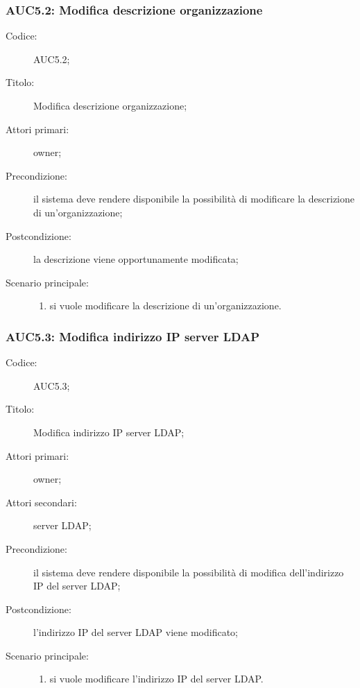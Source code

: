 \documentclass[../../../analisi-dei-requisiti.tex]{subfiles}
\begin{document}
\subsubsection{AUC5.2: Modifica descrizione organizzazione}%
\label{subs:AUC5.2}
\begin{description}
  \item[Codice:] AUC5.2;
  \item[Titolo:] Modifica descrizione organizzazione;
  \item[Attori primari:] owner;
  \item[Precondizione:] il sistema deve rendere disponibile la possibilità di modificare la descrizione di un'organizzazione;
  \item[Postcondizione:] la descrizione viene opportunamente modificata;
  \item[Scenario principale:]
        \begin{enumerate}
          \item si vuole modificare la descrizione di un'organizzazione.
        \end{enumerate}
\end{description}


\subsubsection{AUC5.3: Modifica indirizzo IP server LDAP}%
\label{subs:AUC5.3}
\begin{description}
  \item[Codice:] AUC5.3;
  \item[Titolo:] Modifica indirizzo IP server LDAP\@;
  \item[Attori primari:] owner;
  \item[Attori secondari:] server LDAP\@;
  \item[Precondizione:] il sistema deve rendere disponibile la possibilità di modifica dell'indirizzo IP del server LDAP\@;
  \item[Postcondizione:] l'indirizzo IP del server LDAP viene modificato;
  \item[Scenario principale:]
        \begin{enumerate}
          \item si vuole modificare l'indirizzo IP del server LDAP\@.
        \end{enumerate}
\end{description}
\end{document}
